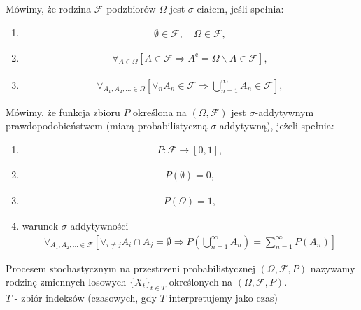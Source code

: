 \newpage
\begin{defi}
Mówimy, że rodzina $ \mathcal F  $ podzbiorów $ \Omega $ jest $ \sigma $-ciałem, jeśli spełnia:
\begin{enumerate}
\item
\begin{gather*}
\emptyset\in \mathcal F ,\quad\Omega\in \mathcal F,
\end{gather*}
\item
\begin{gather*}
\forall_{A\in\Omega}\left[A\in \mathcal F \Rightarrow A^\mathrm c=\Omega\backslash A\in \mathcal F \right],
\end{gather*}
\item 
\begin{gather*}
\forall_{ A_1,A_2,\dots\in\Omega}\left[\forall_n A_n\in \mathcal F \Rightarrow\bigcup_{n=1}^\infty A_n\in \mathcal F \right],
\end{gather*}
\end{enumerate}
\end{defi}
\begin{defi}
Mówimy, że funkcja zbioru $ P $ określona na $ (\Omega,\mathcal F ) $ jest $ \sigma $-addytywnym prawdopodobieństwem (miarą probabilistyczną $ \sigma $-addytywną), jeżeli spełnia:\begin{enumerate}
\item 
\begin{gather*}
P:\mathcal F \rightarrow[0,1],
\end{gather*}
\item 
\begin{gather*}
P(\emptyset)=0,
\end{gather*}
\item 
\begin{gather*}
P(\Omega)=1,
\end{gather*}
\item warunek $ \sigma $-addytywności
\begin{gather*}
\forall_{A_1,A_2,\ldots\in \mathcal F }
\left[\forall_{i\neq j}A_i\cap A_j=\emptyset\Rightarrow P\left(\bigcup_{n=1}^\infty A_n\right)=\sum_{n=1}^{\infty }P(A_n)\right]
\end{gather*}
\end{enumerate}
\end{defi}
\begin{defi}
Procesem stochastycznym na przestrzeni probabilistycznej $(\Omega,\mathcal F,P)$ nazywamy rodzinę zmiennych losowych $ \{X_t\}_{t\in T} $ określonych na $(\Omega,\mathcal F,P)$.\\
$ T $ - zbiór indeksów (czasowych, gdy $ T $ interpretujemy jako czas)
\end{defi}
